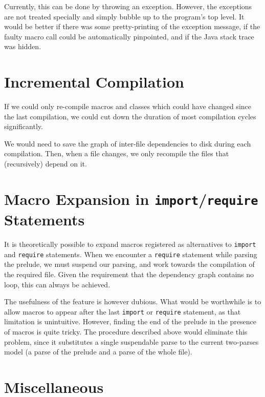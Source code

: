 Currently, this can be done by throwing an exception. However, the exceptions
are not treated specially and simply bubble up to the program's top level. It
would be better if there was some pretty-printing of the exception message, if
the faulty macro call could be automatically pinpointed, and if the Java stack
trace was hidden.

\section{Incremental Compilation}

If we could only re-compile macros and classes which could have changed since
the last compilation, we could cut down the duration of most compilation cycles
significantly.

We would need to save the graph of inter-file dependencies to disk during each
compilation. Then, when a file changes, we only recompile the files that
(recursively) depend on it.

\section{Macro Expansion in \texttt{import}/\texttt{require} Statements}

It is theoretically possible to expand macros registered as alternatives to
\texttt{import} and \texttt{require} statements. When we encounter a
\texttt{require} statement while parsing the prelude, we must suspend our
parsing, and work towards the compilation of the required file. Given the
requirement that the dependency graph contains no loop, this can always be
achieved.

The usefulness of the feature is however dubious. What would be worthwhile is to
allow macros to appear after the last \texttt{import} or \texttt{require}
statement, as that limitation is unintuitive. However, finding the end of the
prelude in the presence of macros is quite tricky. The procedure described above
would eliminate this problem, since it substitutes a single suspendable parse to
the current two-parses model (a parse of the prelude and a parse of the whole
file).

\section{Miscellaneous}

